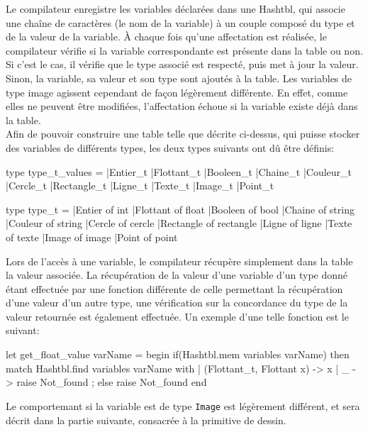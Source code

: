 \documentclass[a4paper, 12pt]{report}
\begin{document}
	Le compilateur enregistre les variables déclarées dans une Hashtbl, qui associe une cha\^ine de caractères (le nom de la variable) à un couple composé du type et de la valeur de la variable. \`A chaque fois qu'une affectation est réalisée, le compilateur vérifie si la variable correspondante est présente dans la table ou non. Si c'est le cas, il vérifie que le type associé est respecté, puis met à jour la valeur. Sinon, la variable, sa valeur et son type sont ajoutés à la table. Les variables de type image agissent cependant de façon légèrement différente. En effet, comme elles ne peuvent être modifiées, l'affectation échoue si la variable existe déjà dans la table.\\
	
	Afin de pouvoir construire une table telle que décrite ci-dessus, qui puisse stocker des variables de différents types, les deux types suivants ont dû être définis:

\begin{multicols}{2}
\begin{verbatimtab}[4]
	type type_t_values =
		|Entier_t
		|Flottant_t
		|Booleen_t
		|Chaine_t
		|Couleur_t
		|Cercle_t
		|Rectangle_t
		|Ligne_t
		|Texte_t
		|Image_t
		|Point_t
		
	type type_t =
		|Entier of int
		|Flottant of float
		|Booleen of bool
		|Chaine of string
		|Couleur of string
		|Cercle of cercle
		|Rectangle of rectangle
		|Ligne of ligne
		|Texte of texte
		|Image of image
		|Point of point
\end{verbatimtab}
\end{multicols}
	
	Lors de l'accès à une variable, le compilateur récupère simplement dans la table la valeur associée. La récupération de la valeur d'une variable d'un type donné étant effectuée par une fonction différente de celle permettant la récupération d'une valeur d'un autre type, une vérification sur la concordance du type de la valeur retournée est également effectuée. Un exemple d'une telle fonction est le suivant:
	
\begin{verbatimtab}[4]
	let get_float_value varName =
	begin
		if(Hashtbl.mem variables varName)
		then
			match Hashtbl.find variables varName with
				|	(Flottant_t, Flottant x)	->	x
				|	_				->	raise Not_found
				;
		else
				raise Not_found
	end
\end{verbatimtab}

	Le comportemant si la variable est de type \texttt{Image} est légèrement différent, et sera décrit dans la partie suivante, consacrée à la primitive de dessin.
\end{document}
